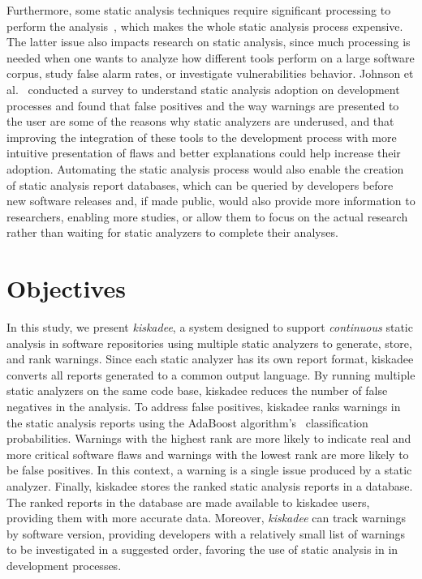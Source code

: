 Furthermore, some static analysis techniques require significant processing to
perform the analysis~\cite{pan_bug_2006}, which makes the whole static analysis
process expensive. The latter issue also impacts research on static analysis,
since much processing is needed when one wants to analyze how different tools
perform on a large software corpus, study false alarm rates, or investigate
vulnerabilities behavior. Johnson et al.~\cite{johnson_why_2013} conducted a
survey to understand static analysis adoption on development processes and
found that false positives and the way warnings are presented to the user are
some of the reasons why static analyzers are underused, and that improving the
integration of these tools to the development process with more intuitive
presentation of flaws and better explanations could help increase their
adoption.  Automating the static analysis process would also enable the
creation of static analysis report databases, which can be queried by
developers before new software releases and, if made public, would also provide
more information to researchers, enabling more studies, or allow them to focus
on the actual research rather than waiting for static analyzers to complete
their analyses.


\section{Objectives}
\label{sec:objectives}

In this study, we present \textit{kiskadee}, a system designed to support
\emph{continuous} static analysis in software repositories using multiple
static analyzers to generate, store, and rank warnings. Since each static
analyzer has its own report format, kiskadee converts all reports generated to
a common output language. By running multiple static analyzers on the same code
base, kiskadee reduces the number of false negatives in the analysis. To
address false positives, kiskadee ranks warnings in the static analysis reports
using the AdaBoost algorithm's~\cite{freund1999short} classification
probabilities.  Warnings with the highest rank are more likely to indicate real
and more critical software flaws and warnings with the lowest rank are more
likely to be false positives. In this context, a warning is a single issue
produced by a static analyzer. Finally, kiskadee stores the ranked static
analysis reports in a database. The ranked reports in the database are made
available to kiskadee users, providing them with more accurate data. Moreover,
\textit{kiskadee} can track warnings by software version, providing developers
with a relatively small list of warnings to be investigated in a suggested
order, favoring the use of static analysis in in development processes.

